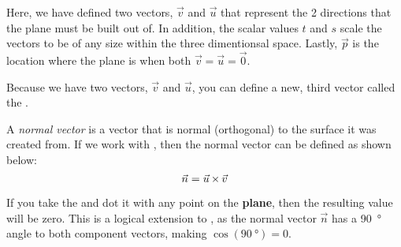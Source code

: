 Here, we have defined two vectors, $\vec{v}$ and $\vec{u}$ that represent the 2 directions that the plane must be built out of.
In addition, the scalar values $t$ and $s$ scale the vectors to be of any size within the three dimentionsal space.
Lastly, $\vec{p}$ is the location where the plane is when both $\vec{v} = \vec{u} = \vec{0}$.

Because we have two vectors, $\vec{v}$ and $\vec{u}$, you can define a new, third vector called the .

\begin{definition}\label{def:Normal_Vector}
  A \emph{normal vector} is a vector that is normal (orthogonal) to the surface it was created from.
  If we work with , then the normal vector can be defined as shown below:
  \begin{equation}\label{eq:Normal_Vector}
    \vec{n} = \vec{u} \operatorname{\times} \vec{v}
  \end{equation}

  \begin{remark}\label{rmk:Component_Vectors_Dot_Product}
    If you take the  and dot it with any point on the \textbf{plane}, then the resulting value will be zero.
    This is a logical extension to , as the normal vector $\vec{n}$ has a \SI{90}{\degree} angle to both component vectors, making $\cos(\SI{90}{\degree}) = 0$.
  \end{remark}
\end{definition}

